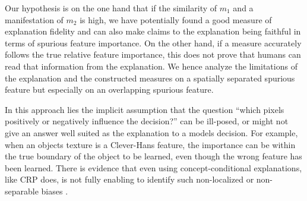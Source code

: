 Our hypothesis is on the one hand that if the similarity of $m_1$ and a manifestation of $m_2$ is high, we have potentially found a good measure of explanation fidelity and can also make claims to the explanation being faithful in terms of spurious feature importance. On the other hand, if a measure accurately follows the true relative feature importance, this does not prove that humans can read that information from the explanation. We hence analyze the limitations of the explanation and the constructed measures on a spatially separated spurious feature but especially on an overlapping spurious feature. 

In this approach lies the implicit assumption that the question ``which pixels positively or negatively influence the decision?'' can be ill-posed, or might not give an answer well suited as the explanation to a models decision. For example, when an objects texture is a Clever-Hans feature, the importance can be within the true boundary of the object to be learned, even though the wrong feature has been learned. There is evidence that even using concept-conditional explanations, like CRP does, is not fully enabling to identify such non-localized or non-separable biases \citep{Dreyer2023a}. 

